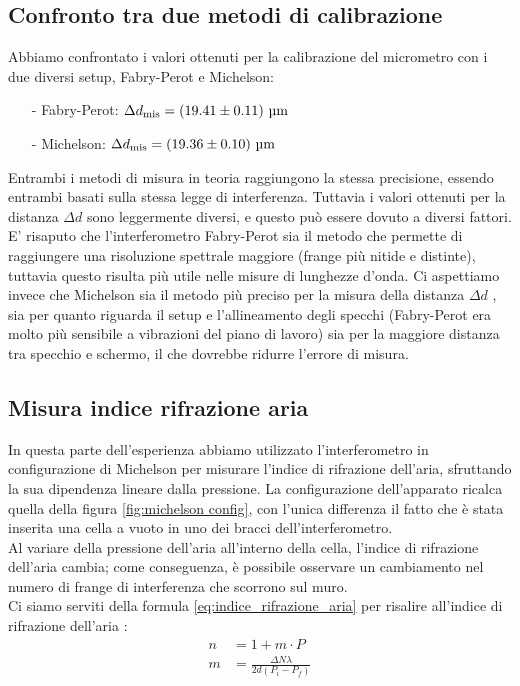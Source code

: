 \documentclass[letterpaper,12pt]{article}
\begin{document}
\subsection{Confronto tra due metodi di calibrazione}

Abbiamo confrontato i valori ottenuti per la calibrazione del micrometro con i due diversi setup, Fabry-Perot e Michelson:
\begin{itemize}
    \item[-] Fabry-Perot: $\Delta d_\text{mis} = (19.41 \pm0.11)\ \text{\SIUnitSymbolMicro m} $
    \item[-] Michelson: $\Delta d_\text{mis} = (19.36 \pm0.10)\ \text{\SIUnitSymbolMicro m} $
\end{itemize}

Entrambi i metodi di misura in teoria raggiungono la stessa precisione, essendo entrambi basati sulla stessa legge di interferenza.
Tuttavia i valori ottenuti per la distanza $\Delta d$ sono leggermente diversi, e questo può essere dovuto a diversi fattori.
E' risaputo che l'interferometro Fabry-Perot sia il metodo che permette di raggiungere una risoluzione spettrale maggiore (frange più nitide e distinte), tuttavia questo risulta più utile nelle misure di lunghezze d'onda.
Ci aspettiamo invece che Michelson sia il metodo più preciso per la misura della distanza $\Delta d$ , sia per quanto riguarda il setup e l'allineamento degli specchi (Fabry-Perot era molto più sensibile a vibrazioni del piano di lavoro)
sia per la maggiore distanza tra specchio e schermo, il che dovrebbe ridurre l'errore di misura.\\


\newpage

\subsection{Misura indice rifrazione aria}
In questa parte dell'esperienza abbiamo utilizzato l'interferometro in configurazione di Michelson per misurare l'indice di rifrazione 
dell'aria, sfruttando la sua dipendenza lineare dalla pressione. La configurazione dell'apparato ricalca quella della figura \ref{fig:michelson config}, 
con l'unica differenza il fatto che è stata inserita una cella a vuoto in uno dei bracci dell'interferometro.\\
Al variare della pressione dell'aria all'interno della cella, l'indice di rifrazione dell'aria cambia; come conseguenza, è possibile
osservare un cambiamento nel numero di frange di interferenza che scorrono sul muro.\\
Ci siamo serviti della formula \ref{eq:indice_rifrazione_aria} per risalire all'indice di rifrazione dell'aria :
\begin{align}
    n &= 1 + m \cdot P \\
    m &=  \frac{\Delta N \lambda }{2 d (P_i - P_f)}
    \label{eq:indice_rifrazione_aria}
\end{align}
\end{document}
